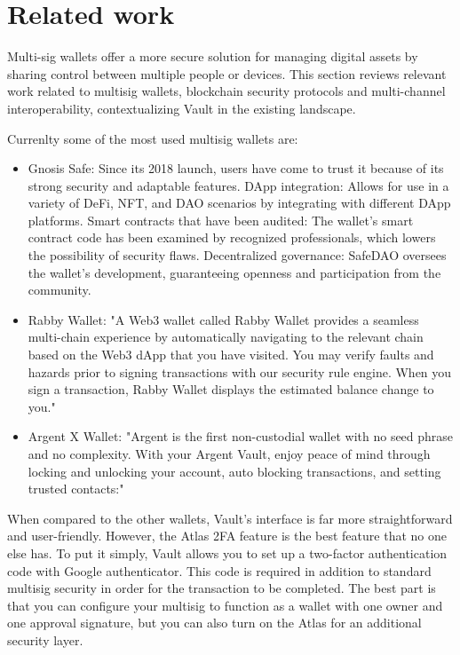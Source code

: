 \section{Related work}
\label{sec:ch1sec3}

\par Multi-sig wallets offer a more secure solution for managing digital assets by sharing control between multiple people or devices. This section reviews relevant work related to multisig wallets, blockchain security protocols and multi-channel interoperability, contextualizing Vault in the existing landscape.
\par Currenlty some of the most used multisig wallets are:
\begin{itemize}
	\item Gnosis Safe: Since its 2018 launch, users have come to trust it because of its strong security and adaptable features. DApp integration: Allows for use in a variety of DeFi, NFT, and DAO scenarios by integrating with different DApp platforms. Smart contracts that have been audited: The wallet's smart contract code has been examined by recognized professionals, which lowers the possibility of security flaws. Decentralized governance: SafeDAO oversees the wallet's development, guaranteeing openness and participation from the community.
	\item Rabby Wallet: "A Web3 wallet called Rabby Wallet provides a seamless multi-chain experience by automatically navigating to the relevant chain based on the Web3 dApp that you have visited. You may verify faults and hazards prior to signing transactions with our security rule engine. When you sign a transaction, Rabby Wallet displays the estimated balance change to you."\cite{rabbywallet}
	\item Argent X Wallet: "Argent is the first non-custodial wallet with no seed phrase and no complexity. With your Argent Vault, enjoy peace of mind through locking and unlocking your account, auto blocking transactions, and setting trusted contacts:"\cite{argent}
\end{itemize}

\par When compared to the other wallets, Vault's interface is far more straightforward and user-friendly. However, the Atlas 2FA feature is the best feature that no one else has. To put it simply, Vault allows you to set up a two-factor authentication code with Google authenticator. This code is required in addition to standard multisig security in order for the transaction to be completed. The best part is that you can configure your multisig to function as a wallet with one owner and one approval signature, but you can also turn on the Atlas for an additional security layer.